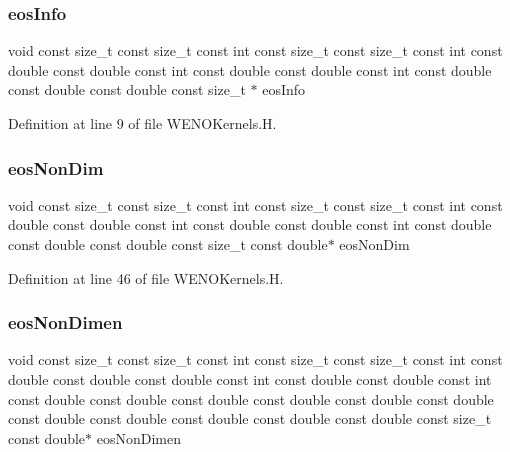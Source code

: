 \hypertarget{WENOKernels_8H_a9b67b225dd1b2bffc0623aa04a80bfc4}{}\label{WENOKernels_8H_a9b67b225dd1b2bffc0623aa04a80bfc4} 
\subsubsection{\texorpdfstring{eos\+Info}{eosInfo}}
{\footnotesize\ttfamily void const size\+\_\+t const size\+\_\+t const int const size\+\_\+t const size\+\_\+t const int const double const double const int const double const double const int const double const double const double const size\+\_\+t $\ast$ eos\+Info}



Definition at line 9 of file W\+E\+N\+O\+Kernels.\+H.

\hypertarget{WENOKernels_8H_ae84c458d3f8dce53d214eabcdc84b623}{}\label{WENOKernels_8H_ae84c458d3f8dce53d214eabcdc84b623} 
\subsubsection{\texorpdfstring{eos\+Non\+Dim}{eosNonDim}}
{\footnotesize\ttfamily void const size\+\_\+t const size\+\_\+t const int const size\+\_\+t const size\+\_\+t const int const double const double const int const double const double const int const double const double const double const size\+\_\+t const double$\ast$ eos\+Non\+Dim}



Definition at line 46 of file W\+E\+N\+O\+Kernels.\+H.

\hypertarget{WENOKernels_8H_ab086e80006b932eb5dadc76f88126367}{}\label{WENOKernels_8H_ab086e80006b932eb5dadc76f88126367} 
\subsubsection{\texorpdfstring{eos\+Non\+Dimen}{eosNonDimen}}
{\footnotesize\ttfamily void const size\+\_\+t const size\+\_\+t const int const size\+\_\+t const size\+\_\+t const int const double const double const double const int const double const double const int const double const double const double const double const double const double const double const double const double const double const double const size\+\_\+t const double$\ast$ eos\+Non\+Dimen}



